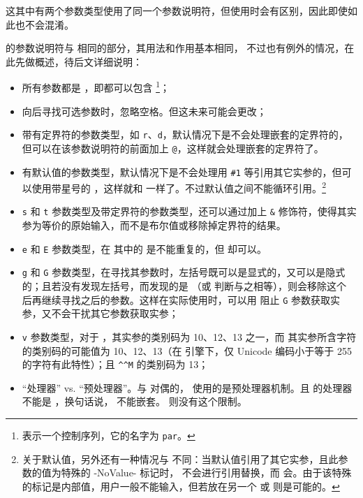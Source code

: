 \documentclass[openany]{book}
\begin{document}
这其中有两个参数类型使用了同一个参数说明符，但使用时会有区别，因此即使如此也不会混淆。

 的参数说明符与  相同的部分，其用法和作用基本相同，
不过也有例外的情况，在此先做概述，待后文详细说明：
\begin{itemize}
  \item 所有参数都是 ，即都可以包含 \footnote{ 表示一个控制序列，它的名字为 \texttt{par}。}；
  \item 向后寻找可选参数时，忽略空格。但这未来可能会更改；
  \item 带有定界符的参数类型，如 \texttt r、\texttt d，默认情况下是不会处理嵌套的定界符的，但可以在该参数说明符的前面加上 \texttt @，这样就会处理嵌套的定界符了。
  \item 有默认值的参数类型，默认情况下是不会处理用 \verb|#1| 等引用其它实参的，但可以使用带星号的 ，这样就和  一样了。不过默认值之间不能循环引用。\footnote{关于默认值，另外还有一种情况与  不同：当默认值引用了其它实参，且此参数的值为特殊的 -NoValue- 标记时， 不会进行引用替换，而  会。由于该特殊的标记是内部值，用户一般不能输入，但若放在另一个  或  则是可能的。}
  \item \texttt s 和 \texttt t 参数类型及带定界符的参数类型，还可以通过加上 \texttt\& 修饰符，使得其实参为等价的原始输入，而不是布尔值或移除掉定界符的结果。
  \item \texttt e 和 \texttt E 参数类型，在  其中的  是不能重复的，但  却可以。
  \item \texttt g 和 \texttt G 参数类型，在寻找其参数时，左括号既可以是显式的，又可以是隐式的；且若没有发现左括号，而发现的是 （或  判断与之相等），则会移除这个  后再继续寻找之后的参数。这样在实际使用时，可以用  阻止 \texttt G 参数获取实参，又不会干扰其它参数获取实参；
  \item \texttt{v} 参数类型，对于 ，其实参的类别码为 10、12、13 之一，而  其实参所含字符的类别码的可能值为 10、12、13（在 \pupTeX 引擎下，仅 Unicode 编码小于等于 255 的字符有此特性）；且 \texttt{\^{}\^{}M} 的类别码为 13；
  \item “处理器” vs. “预处理器”。与  对偶的， 使用的是预处理器机制。且  的处理器不能是 ，换句话说， 不能嵌套。 则没有这个限制。
\end{itemize}
\end{document}
